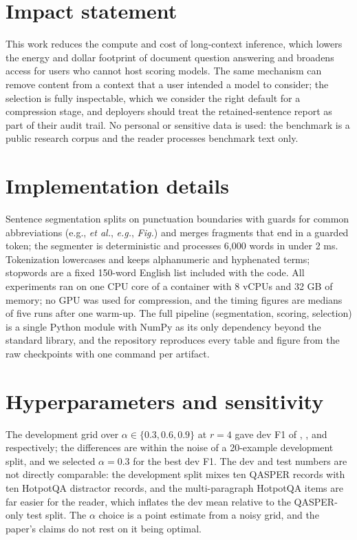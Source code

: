 \documentclass{article}
\begin{document}
\section*{Impact statement}
This work reduces the compute and cost of long-context inference, which
lowers the energy and dollar footprint of document question answering
and broadens access for users who cannot host scoring models. The same
mechanism can remove content from a context that a user intended a
model to consider; the selection is fully inspectable, which we
consider the right default for a compression stage, and deployers
should treat the retained-sentence report as part of their audit trail.
No personal or sensitive data is used: the benchmark is a public
research corpus and the reader processes benchmark text only.




\appendix

\section{Implementation details}
\label{app:impl}

Sentence segmentation splits on punctuation boundaries with guards for
common abbreviations (e.g., \emph{et al.}, \emph{e.g.}, \emph{Fig.}) and
merges fragments that end in a guarded token; the segmenter is
deterministic and processes 6{,}000 words in under 2 ms. Tokenization
lowercases and keeps alphanumeric and hyphenated terms; stopwords are a
fixed 150-word English list included with the code. All experiments ran
on one CPU core of a container with 8 vCPUs and 32 GB of memory; no GPU
was used for compression, and the timing figures are medians of five
runs after one warm-up. The full pipeline (segmentation, scoring,
selection) is a single Python module with NumPy as its only dependency
beyond the standard library, and the repository reproduces every table
and figure from the raw checkpoints with one command per artifact.

\section{Hyperparameters and sensitivity}
\label{app:hyper}

The development grid over $\alpha \in \{0.3,0.6,0.9\}$ at $r=4$ gave dev
F1 of \GridALo, \GridAMid, and \GridAHi{} respectively; the differences
are within the noise of a 20-example development split, and we selected
$\alpha=0.3$ for the best dev F1. The dev and test numbers are not
directly comparable: the development split mixes ten QASPER records
with ten HotpotQA distractor records, and the multi-paragraph HotpotQA
items are far easier for the reader, which inflates the dev mean
relative to the QASPER-only test split. The $\alpha$ choice is a point
estimate from a noisy grid, and the paper's claims do not rest on it
being optimal.
\end{document}
